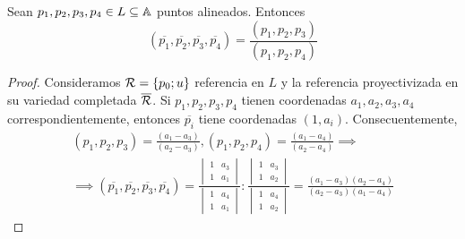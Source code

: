 \begin{prop}
  Sean $p_1, p_2, p_3, p_4 \in L \subseteq \mathbb{A}$ puntos alineados. Entonces
  \[(\overline{p_1}, \overline{p_2}, \overline{p_3}, \overline{p_4}) = 
  \frac{(p_1, p_2, p_3)}{(p_1, p_2, p_4)}\]
\end{prop}
\begin{proof}
  Consideramos $\mathcal{R} = \{p_0; u\}$ referencia en $L$ y la referencia proyectivizada
  en su variedad completada $\overline{\mathcal{R}}$. Si $p_1, p_2, p_3, p_4$ tienen coordenadas
  $a_1, a_2, a_3, a_4$ correspondientemente, entonces $\overline{p_i}$ tiene coordenadas
  $(1, a_i)$. Consecuentemente,
  \begin{gather*} 
    (p_1, p_2, p_3) =\frac{(a_1-a_3)}{(a_2-a_3)},
 (p_1, p_2, p_4) =\frac{(a_1-a_4)}{(a_2-a_4)} \implies \\
 \implies 
     (\overline{p_1}, \overline{p_2}, \overline{p_3}, \overline{p_4}) =
    \frac{
        \begin{vmatrix}
          1 & a_3 \\ 1 & a_1 
        \end{vmatrix}
      }
      {
        \begin{vmatrix}
        1 & a_4\\
        1 & a_1
    \end{vmatrix}
  }
    :
    \frac{
        \begin{vmatrix}
          1 & a_3 \\ 1 & a_2 
        \end{vmatrix}
      }
      {
        \begin{vmatrix}
        1 & a_4 \\
        1 & a_2
    \end{vmatrix}
  }
  = \frac{(a_1-a_3)(a_2-a_4)}{(a_2-a_3)(a_1-a_4)}
\end{gather*}
\end{proof}
